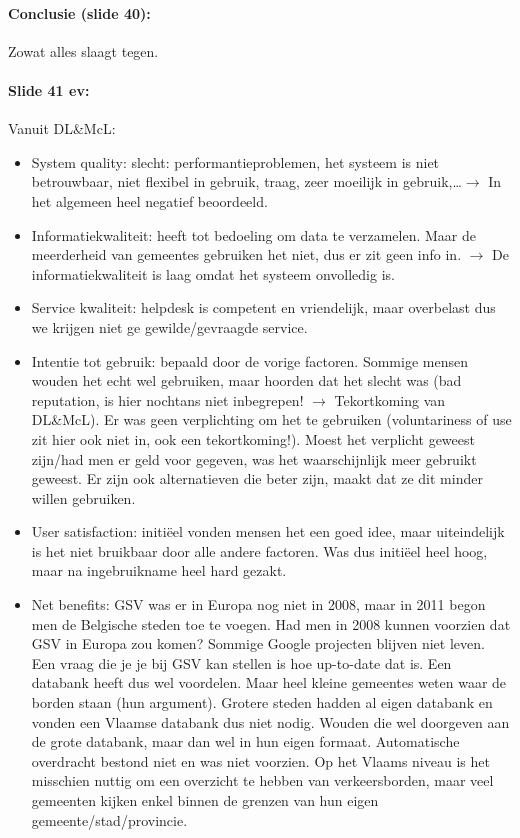 \documentclass[10pt,a4paper]{report}
\begin{document}
\paragraph{Conclusie (slide 40):}Zowat alles slaagt tegen.

\paragraph{Slide 41 ev:} Vanuit DL\&McL:
\begin{itemize}
\item System quality: slecht: performantieproblemen, het systeem is niet betrouwbaar, niet flexibel in gebruik, traag, zeer moeilijk in gebruik,\ldots $\rightarrow$ In het algemeen heel negatief beoordeeld.
\item Informatiekwaliteit: heeft tot bedoeling om data te verzamelen. Maar de meerderheid van gemeentes gebruiken het niet, dus er zit geen info in. $\rightarrow$ De informatiekwaliteit is laag omdat het systeem onvolledig is.
\item Service kwaliteit: helpdesk is competent en vriendelijk, maar overbelast dus we krijgen niet ge gewilde/gevraagde service.
\item Intentie tot gebruik: bepaald door de vorige factoren. Sommige mensen wouden het echt wel gebruiken, maar hoorden dat het slecht was (bad reputation, is hier nochtans niet inbegrepen! $\rightarrow$ Tekortkoming van DL\&McL). Er was geen verplichting om het te gebruiken (voluntariness of use zit hier ook niet in, ook een tekortkoming!). Moest het verplicht geweest zijn/had men er geld voor gegeven, was het waarschijnlijk meer gebruikt geweest. Er zijn ook alternatieven die beter zijn, maakt dat ze dit minder willen gebruiken.
\item User satisfaction: initiëel vonden mensen het een goed idee, maar uiteindelijk is het niet bruikbaar door alle andere factoren. Was dus initiëel heel hoog, maar na ingebruikname heel hard gezakt.
\item Net benefits: GSV was er in Europa nog niet in 2008, maar in 2011 begon men de Belgische steden toe te voegen. Had men in 2008 kunnen voorzien dat GSV in Europa zou komen? Sommige Google projecten blijven niet leven. Een vraag die je je bij GSV kan stellen is hoe up-to-date dat is. Een databank heeft dus wel voordelen. Maar heel kleine gemeentes weten waar de borden staan (hun argument). Grotere steden hadden al eigen databank en vonden een Vlaamse databank dus niet nodig. Wouden die wel doorgeven aan de grote databank, maar dan wel in hun eigen formaat. Automatische overdracht bestond niet en was niet voorzien. Op het Vlaams niveau is het misschien nuttig om een overzicht te hebben van verkeersborden, maar veel gemeenten kijken enkel binnen de grenzen van hun eigen gemeente/stad/provincie.\\ 

\end{itemize}
\end{document}
